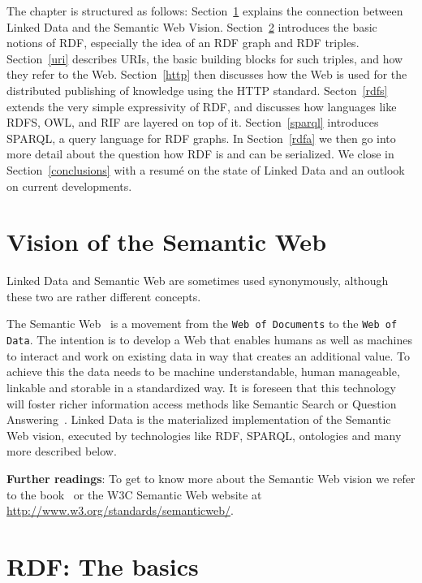 The chapter is structured as follows:
Section~\ref{semanticweb} explains the connection between Linked Data and the Semantic Web Vision.
Section~\ref{rdf} introduces the basic notions of RDF, especially the idea of an RDF graph and RDF triples.
Section~\ref{uri} describes URIs, the basic building blocks for such triples, and how they refer to the Web.
Section~\ref{http} then discusses how the Web is used for the distributed publishing of knowledge using the HTTP standard.
Secton~\ref{rdfs} extends the very simple expressivity of RDF, and discusses how languages like RDFS, OWL, and RIF are layered on top of it.
Section~\ref{sparql} introduces SPARQL, a query language for RDF graphs.
In Section~\ref{rdfa} we then go into more detail about the question how RDF is and can be serialized.
We close in Section~\ref{conclusions} with a resum\'{e} on the state of Linked Data and an outlook on current developments.

\section{Vision of the Semantic Web}
\label{semanticweb}

Linked Data and Semantic Web are sometimes used synonymously, although these two are rather different concepts.

The Semantic Web~\cite{bernerslee2001semantic} is a movement from the \texttt{Web of Documents} to the \texttt{Web of Data}.
The intention is to develop a Web that enables humans as well as machines to interact and work on existing data in way that creates an additional value.
To achieve this the data needs to be machine understandable, human manageable, linkable and storable in a standardized way.
It is foreseen that this technology will foster richer information access methods like Semantic Search or Question Answering~\cite{combiningLDandIR}.
Linked Data is the materialized implementation of the Semantic Web vision, executed by technologies like RDF, SPARQL, ontologies and many more described below.

\medskip

\textbf{Further readings}:
To get to know more about the Semantic Web vision we refer to the book~\cite{swbook} or the W3C Semantic Web website at \url{http://www.w3.org/standards/semanticweb/}.

\section{RDF: The basics}
\label{rdf}

